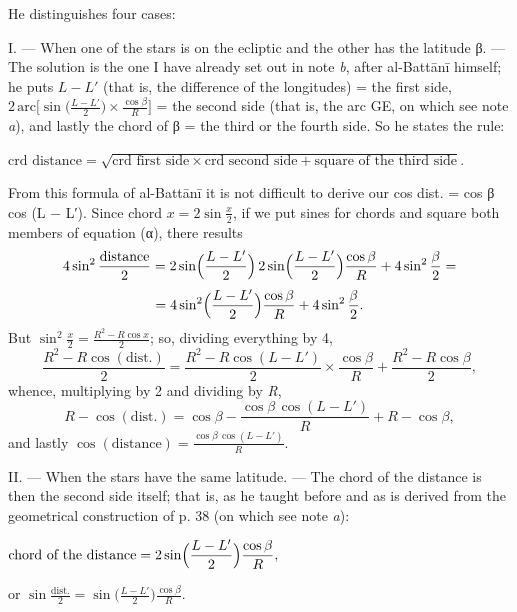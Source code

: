 \documentclass[11pt]{article}
\begin{document}
\par He distinguishes four cases:\par
\par I. — When one of the stars is on the ecliptic and the other has the latitude {\greekfont β}. — The solution is the one I have already set out in note \emph{b}, after al-Battānī himself; he puts $L - L'$ (that is, the difference of the longitudes) = the first side, $2\,\text{arc}\bigl[\sin\bigl(\frac{L - L'}{2}\bigr) \times \frac{\cos\beta}{R}\bigr]$ = the second side (that is, the arc GE, on which see note \emph{a}), and lastly the chord of {\greekfont β} = the third or the fourth side. So he states the rule: \par\noindent\hspace*{1.5em}$\displaystyle \text{crd distance} = \sqrt{\text{crd first side} \times \text{crd second side} + \text{square of the third side}}.$\par From this formula of al-Battānī it is not difficult to derive our cos dist. = cos {\greekfont β} cos (L − L′). Since chord $x = 2\sin\frac{x}{2}$, if we put sines for chords and square both members of equation ({\greekfont α}), there results \[ 4\sin^2\frac{\text{distance}}{2} = 2\sin\Bigl(\frac{L - L'}{2}\Bigr)\,2\sin\Bigl(\frac{L - L'}{2}\Bigr)\frac{\cos\beta}{R} + 4\sin^2\frac{\beta}{2} = \] \[ = 4\sin^2\Bigl(\frac{L - L'}{2}\Bigr)\frac{\cos\beta}{R} + 4\sin^2\frac{\beta}{2}. \] But $\sin^2\frac{x}{2} = \frac{R^2 - R\cos x}{2}$; so, dividing everything by 4, \[ \frac{R^2 - R\cos(\text{dist.})}{2} = \frac{R^2 - R\cos(L - L')}{2} \times \frac{\cos\beta}{R} + \frac{R^2 - R\cos\beta}{2}, \] whence, multiplying by 2 and dividing by \emph{R}, \[ R - \cos(\text{dist.}) = \cos\beta - \frac{\cos\beta\,\cos(L - L')}{R} + R - \cos\beta, \] and lastly $\cos(\text{distance}) = \frac{\cos\beta\,\cos(L - L')}{R}$.\par
\par II. — When the stars have the same latitude. — The chord of the distance is then the second side itself; that is, as he taught before and as is derived from the geometrical construction of p. 38 (on which see note \emph{a}): \par\noindent\hspace*{1.5em}$\displaystyle \text{chord of the distance} = 2\sin\Bigl(\frac{L - L'}{2}\Bigr)\frac{\cos\beta}{R},$\par or $\sin\frac{\text{dist.}}{2} = \sin\bigl(\frac{L - L'}{2}\bigr)\frac{\cos\beta}{R}$.\par
\end{document}
